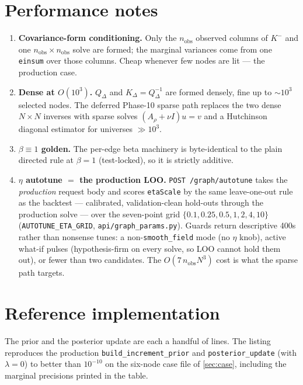 \documentclass[11pt]{article}
\newcommand{\Qdel}{Q_{\Delta}}
\newcommand{\Kdel}{K_{\Delta}}
\newcommand{\Arho}{A_{\rho}}
\begin{document}
\section{Performance notes}
\label{app:perf}

\begin{enumerate}[leftmargin=1.6em]
\item \textbf{Covariance-form conditioning.} Only the $n_{\text{obs}}$ observed
columns of $K^-$ and one $n_{\text{obs}}\times n_{\text{obs}}$ solve are
formed; the marginal variances come from one \texttt{einsum} over those columns.
Cheap whenever few nodes are lit --- the production case.
\item \textbf{Dense at $O(10^3)$.} $\Qdel$ and $\Kdel=\Qdel^{-1}$ are formed
densely, fine up to $\sim10^3$ selected nodes. The deferred Phase-10 sparse path
replaces the two dense $N\times N$ inverses with sparse solves
$(\Arho+\nu I)u=v$ and a Hutchinson diagonal estimator for universes
$\gg10^3$.
\item \textbf{$\beta\equiv1$ golden.} The per-edge beta machinery is
byte-identical to the plain directed rule at $\beta=1$ (test-locked), so it is
strictly additive.
\item \textbf{$\eta$ autotune $=$ the production LOO.}
\texttt{POST /graph/autotune} takes the \emph{production} request body and
scores \texttt{etaScale} by the same leave-one-out rule as the backtest ---
calibrated, validation-clean hold-outs through the production solve --- over
the seven-point grid $\{0.1,0.25,0.5,1,2,4,10\}$
(\texttt{AUTOTUNE\_ETA\_GRID}, \nolinkurl{api/graph_params.py}). Guards
return descriptive 400s rather than nonsense tunes: a
non-\texttt{smooth\_field} mode (no $\eta$ knob), active what-if pulses
(hypothesis-firm on every solve, so LOO cannot hold them out), or fewer than
two candidates. The $O(7\,n_{\text{obs}}N^3)$ cost is what the sparse path
targets.
\end{enumerate}

\section{Reference implementation}
\label{app:ref}

The prior and the posterior update are each a handful of lines. The listing
reproduces the production \texttt{build\_increment\_prior} and
\texttt{posterior\_update} (with $\lambda=0$) to better than $10^{-10}$ on the
six-node case file of \cref{sec:case}, including the marginal precisions
printed in the table.
\end{document}
